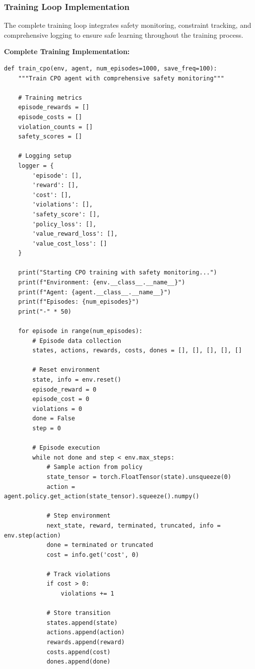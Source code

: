 \documentclass[12pt]{article}
\begin{document}
{{{{\subsubsection{Training Loop Implementation}

The complete training loop integrates safety monitoring, constraint tracking, and comprehensive logging to ensure safe learning throughout the training process.

\textbf{Complete Training Implementation:}
\begin{verbatim}
def train_cpo(env, agent, num_episodes=1000, save_freq=100):
    """Train CPO agent with comprehensive safety monitoring"""
    
    # Training metrics
    episode_rewards = []
    episode_costs = []
    violation_counts = []
    safety_scores = []
    
    # Logging setup
    logger = {
        'episode': [],
        'reward': [],
        'cost': [],
        'violations': [],
        'safety_score': [],
        'policy_loss': [],
        'value_reward_loss': [],
        'value_cost_loss': []
    }
    
    print("Starting CPO training with safety monitoring...")
    print(f"Environment: {env.__class__.__name__}")
    print(f"Agent: {agent.__class__.__name__}")
    print(f"Episodes: {num_episodes}")
    print("-" * 50)
    
    for episode in range(num_episodes):
        # Episode data collection
        states, actions, rewards, costs, dones = [], [], [], [], []
        
        # Reset environment
        state, info = env.reset()
        episode_reward = 0
        episode_cost = 0
        violations = 0
        done = False
        step = 0
        
        # Episode execution
        while not done and step < env.max_steps:
            # Sample action from policy
            state_tensor = torch.FloatTensor(state).unsqueeze(0)
            action = agent.policy.get_action(state_tensor).squeeze().numpy()
            
            # Step environment
            next_state, reward, terminated, truncated, info = env.step(action)
            done = terminated or truncated
            cost = info.get('cost', 0)
            
            # Track violations
            if cost > 0:
                violations += 1
            
            # Store transition
            states.append(state)
            actions.append(action)
            rewards.append(reward)
            costs.append(cost)
            dones.append(done)
            

\end{verbatim}}}}}
\end{document}
